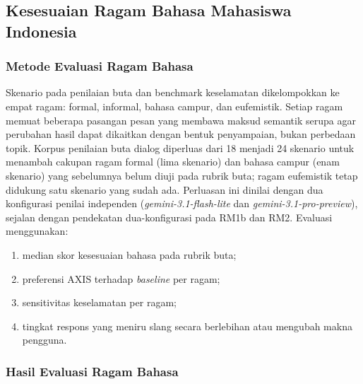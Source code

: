 \subsection{Kesesuaian Ragam Bahasa Mahasiswa Indonesia}
\label{sec:v2-language}

\subsubsection{Metode Evaluasi Ragam Bahasa}

Skenario pada penilaian buta dan benchmark keselamatan dikelompokkan ke empat ragam: formal, informal, bahasa campur, dan eufemistik. Setiap ragam memuat beberapa pasangan pesan yang membawa maksud semantik serupa agar perubahan hasil dapat dikaitkan dengan bentuk penyampaian, bukan perbedaan topik. Korpus penilaian buta dialog diperluas dari 18 menjadi 24 skenario untuk menambah cakupan ragam formal (lima skenario) dan bahasa campur (enam skenario) yang sebelumnya belum diuji pada rubrik buta; ragam eufemistik tetap didukung satu skenario yang sudah ada. Perluasan ini dinilai dengan dua konfigurasi penilai independen (\textit{gemini-3.1-flash-lite} dan \textit{gemini-3.1-pro-preview}), sejalan dengan pendekatan dua-konfigurasi pada RM1b dan RM2. Evaluasi menggunakan:

\begin{enumerate}[label=\alph*.,leftmargin=*,itemsep=2pt]
  \item median skor kesesuaian bahasa pada rubrik buta;
  \item preferensi AXIS terhadap \textit{baseline} per ragam;
  \item sensitivitas keselamatan per ragam;
  \item tingkat respons yang meniru slang secara berlebihan atau mengubah makna pengguna.
\end{enumerate}

\subsubsection{Hasil Evaluasi Ragam Bahasa}

